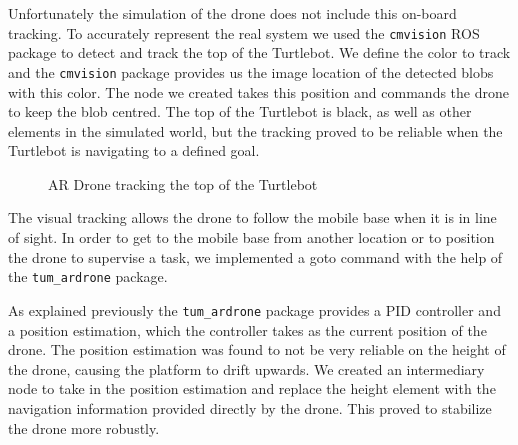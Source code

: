 \documentclass[11pt,a4paper,twocolumn]{article}
\begin{document}
Unfortunately the simulation of the drone does not include this on-board tracking. To accurately represent the real system we used the \verb!cmvision! ROS package to detect and track the top of the Turtlebot. We define the color to track and the \verb!cmvision! package provides us the image location of the detected blobs with this color. The node we created takes this position and commands the drone to keep the blob centred. The top of the Turtlebot is black, as well as other elements in the simulated world, but the tracking proved to be reliable when the Turtlebot is navigating to a defined goal.


\begin{figure}[ht!]%
	\centering
    \qquad  
    \caption{AR Drone tracking the top of the Turtlebot}
    \label{fig:simTracking}
\end{figure}


The visual tracking allows the drone to follow the mobile base when it is in line of sight. In order to get to the mobile base from another location or to position the drone to supervise a task, we implemented a goto command with the help of the \verb!tum_ardrone! package.

As explained previously the \verb!tum_ardrone! package provides a PID controller and a position estimation, which the controller takes as the current position of the drone. The position estimation was found to not be very reliable on the height of the drone, causing the platform to drift upwards. We created an intermediary node to take in the position estimation and replace the height element with the navigation information provided directly by the drone. This proved to stabilize the drone more robustly.
\end{document}
